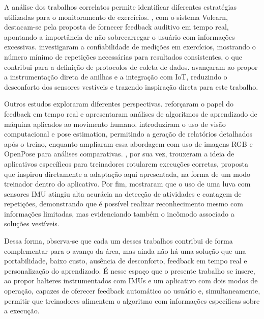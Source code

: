 A análise dos trabalhos correlatos permite identificar diferentes estratégias utilizadas para o monitoramento de exercícios. , com o sistema Volearn, destacam-se pela proposta de fornecer feedback auditivo em tempo real, apontando a importância de não sobrecarregar o usuário com informações excessivas.  investigaram a confiabilidade de medições em exercícios, mostrando o número mínimo de repetições necessárias para resultados consistentes, o que contribui para a definição de protocolos de coleta de dados.  avançaram ao propor a instrumentação direta de anilhas e a integração com IoT, reduzindo o desconforto dos sensores vestíveis e trazendo inspiração direta para este trabalho.  

Outros estudos exploraram diferentes perspectivas.  reforçaram o papel do feedback em tempo real e apresentaram análises de algoritmos de aprendizado de máquina aplicados ao movimento humano.  introduziram o uso de visão computacional e pose estimation, permitindo a geração de relatórios detalhados após o treino, enquanto  ampliaram essa abordagem com uso de imagens RGB e OpenPose para análises comparativas. , por sua vez, trouxeram a ideia de aplicativos específicos para treinadores rotularem execuções corretas, proposta que inspirou diretamente a adaptação aqui apresentada, na forma de um modo treinador dentro do aplicativo. Por fim,  mostraram que o uso de uma luva com sensores IMU atingiu alta acurácia na detecção de atividades e contagem de repetições, demonstrando que é possível realizar reconhecimento mesmo com informações limitadas, mas evidenciando também o incômodo associado a soluções vestíveis.  

Dessa forma, observa-se que cada um desses trabalhos contribui de forma complementar para o avanço da área, mas ainda não há uma solução que una portabilidade, baixo custo, ausência de desconforto, feedback em tempo real e personalização do aprendizado. É nesse espaço que o presente trabalho se insere, ao propor halteres instrumentados com IMUs e um aplicativo com dois modos de operação, capazes de oferecer feedback automático ao usuário e, simultaneamente, permitir que treinadores alimentem o algoritmo com informações específicas sobre a execução.

